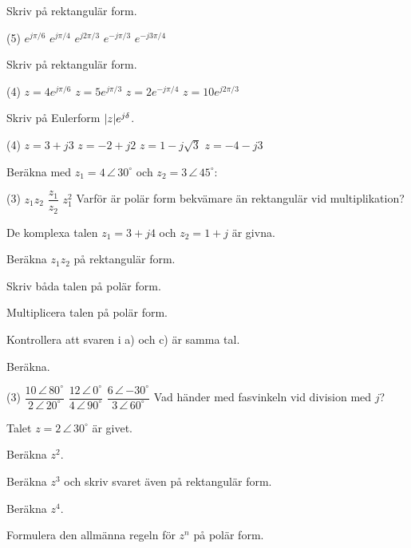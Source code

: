 Skriv på rektangulär form.
\begin{delar}(5)
  \task $e^{j\pi/6}$
  \task $e^{j\pi/4}$
  \task $e^{j2\pi/3}$
  \task $e^{-j\pi/3}$
  \task $e^{-j3\pi/4}$
\end{delar}

Skriv på rektangulär form.
\begin{delar}(4)
  \task $z = 4e^{j\pi/6}$
  \task $z = 5e^{j\pi/3}$
  \task $z = 2e^{-j\pi/4}$
  \task $z = 10e^{j2\pi/3}$
\end{delar}

Skriv på Eulerform $\lvert z\rvert e^{j\delta}$.
\begin{delar}(4)
  \task $z = 3 + j3$
  \task $z = -2 + j2$
  \task $z = 1 - j\sqrt{3}$
  \task $z = -4 - j3$
\end{delar}

Beräkna med $z_1 = 4\,\angle\,30^{\circ}$ och $z_2 = 3\,\angle\,45^{\circ}$:
\begin{delar}(3)
  \task $z_1z_2$
  \task $\dfrac{z_1}{z_2}$
  \task $z_1^2$
  \task* Varför är polär form bekvämare än rektangulär vid multiplikation?
\end{delar}

De komplexa talen $z_1 = 3 + j4$ och $z_2 = 1 + j$ är givna.
\begin{parts}
  \item Beräkna $z_1z_2$ på rektangulär form.
  \item Skriv båda talen på polär form.
  \item Multiplicera talen på polär form.
  \item Kontrollera att svaren i a) och c) är samma tal.
\end{parts}

Beräkna.
\begin{delar}(3)
  \task $\dfrac{10\,\angle\,80^{\circ}}{2\,\angle\,20^{\circ}}$
  \task $\dfrac{12\,\angle\,0^{\circ}}{4\,\angle\,90^{\circ}}$
  \task $\dfrac{6\,\angle\,{-30^{\circ}}}{3\,\angle\,60^{\circ}}$
  \task* Vad händer med fasvinkeln vid division med $j$?
\end{delar}

Talet $z = 2\,\angle\,30^{\circ}$ är givet.
\begin{parts}
  \item Beräkna $z^2$.
  \item Beräkna $z^3$ och skriv svaret även på rektangulär form.
  \item Beräkna $z^4$.
  \item Formulera den allmänna regeln för $z^n$ på polär form.
\end{parts}

